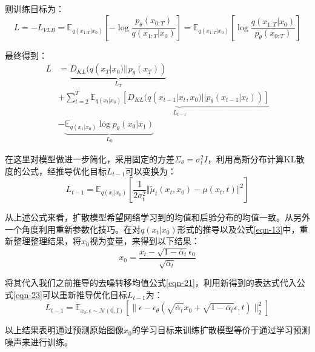 \par
则训练目标为：
\begin{equation}\label{eqn-22}
L = - L_{VLB} = \mathbb{E}_{q(x_{1:T}|x_0)}[-\log{\frac{p_{\theta}(x_{0:T})}{q(x_{1:T}|x_0)}}] = \mathbb{E}_{q(x_{1:T}|x_0)}[\log{\frac{q(x_{1:T}|x_0)}{p_{\theta}(x_{0:T})}}]
\end{equation}
\par
最终得到：
\begin{align}
      L &= \underbrace{D_{KL}(q(x_T|x_0) || p_\theta(x_T))}_{L_T} \nonumber\\
      &+ \sum^T_{t=2}{\underbrace{\mathbb{E}_{q(x_t|x_0)}[D_{KL}(q(x_{t-1}|x_t,x_0) || p_\theta(x_{t-1}|x_t))]}_{L_{t-1}}} \nonumber\\
      &- \underbrace{\mathbb{E}_{q(x_1|x_0)}\log{p_\theta(x_0|x_1)}}_{L_0} \label{eqn-23}
\end{align}
\par
在这里对模型做进一步简化，采用固定的方差$\Sigma_\theta=\sigma^2_tI$，利用高斯分布计算KL散度的公式，经推导优化目标$L_{t-1}$可以变换为：
\begin{equation}\label{eqn-24}
L_{t-1}=\mathbb{E}_{q(x_t|x_0)}[\frac{1}{2\sigma^2_t}\Vert \widetilde{\mu}_t(x_t,x_0)-\mu(x_t,t) \Vert^2]
\end{equation}
\par
从上述公式来看，扩散模型希望网络学习到的均值和后验分布的均值一致。从另外一个角度利用重新参数化技巧。在对$q ( x_t | x_0 )$形式的推导以及公式\eqref{eqn-13}中，重新整理整理结果，将$x_0$视为变量，来得到以下结果：
\begin{equation}\label{eqn-25}
      x_0 = \frac{x_t - \sqrt{1-\overline{\alpha}_t}\epsilon_0}{\sqrt{\overline{\alpha}_t}}
\end{equation}
\par
将其代入我们之前推导的去噪转移均值公式\eqref{eqn-21}，利用新得到的表达式代入公式\eqref{eqn-23}可以重新推导优化目标$L_{t-1}$为：
\begin{equation}\label{eqn-26}
      L_{t-1}=\mathbb{E}_{x_0,\epsilon \sim \mathcal{N}(0,I)}[\lVert \epsilon - \epsilon_\theta (\sqrt{\overline{\alpha}_t}x_0 + \sqrt{1 - \overline{\alpha}_t}\epsilon,t)\rVert^2_2]
\end{equation}
\par
以上结果表明通过预测原始图像$x_0$的学习目标来训练扩散模型等价于通过学习预测噪声来进行训练。
